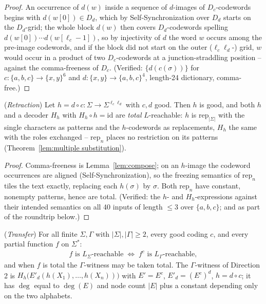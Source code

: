 \begin{proof}
    An occurrence of $d(w)$ inside a sequence of $d$-images of
    $D_c$-codewords begins with $d(w[0]) \in D_d$, which by
    Self-Synchronization over $D_d$ starts on the $D_d$-grid; the whole
    block $d(w)$ then covers $D_d$-codewords spelling
    $d(w[0]) \cdots d(w[\ell_c{-}1])$, so by injectivity of $d$ the word $w$
    occurs among the pre-image codewords, and if the block did not start on
    the outer ($\ell_c\ell_d$-) grid, $w$ would occur in a product of two
    $D_c$-codewords at a junction-straddling position -- against the
    comma-freeness of $D_c$. (Verified: $\{d(c(\sigma))\}$ for $c :
    \{a,b,c\} \rightarrow \{x,y\}^6$ and $d : \{x,y\} \rightarrow
    \{a,b,c\}^4$, length-24 dictionary, comma-free.)
\end{proof}

\begin{lemma}
    (\emph{Retraction})
    \label{lem:retract}
    Let $h = d \circ c : \Sigma \rightarrow \Sigma^{\ell_c\ell_d}$ with
    $c, d$ good. Then $h$ is good, and both $h$ and a decoder $H_h$ with
    $H_h \circ h = \mathrm{id}$ are \emph{total} $L$-reachable: $h$ is
    $\mathrm{rep}_{|\Sigma|}$ with the single characters as patterns and
    the $h$-codewords as replacements, $H_h$ the same with the roles
    exchanged -- $\mathrm{rep}_n$ places no restriction on its patterns
    (Theorem~\ref{lem:multiple substitution}).
\end{lemma}

\begin{proof}
    Comma-freeness is Lemma~\ref{lem:compose}; on an $h$-image the codeword
    occurrences are aligned (Self-Synchronization), so the freezing
    semantics of $\mathrm{rep}_n$ tiles the text exactly, replacing each
    $h(\sigma)$ by $\sigma$. Both $\mathrm{rep}_n$ have constant, nonempty
    patterns, hence are total. (Verified: the $h$- and $H_h$-expressions
    against their intended semantics on all 40 inputs of length $\le 3$
    over $\{a,b,c\}$; and as part of the roundtrip below.)
\end{proof}

\begin{theorem}
    (\emph{Transfer})
    \label{thm:transfer}
    For all finite $\Sigma, \Gamma$ with $|\Sigma|, |\Gamma| \ge 2$, every
    good coding $c$, and every partial function $f$ on $\Sigma^*$:
    \begin{align}
        f \text{ is $L_\Sigma$-reachable} \;\iff\; f^c \text{ is
        $L_\Gamma$-reachable},
    \end{align}
    and when $f$ is total the $\Gamma$-witness may be taken total. The
    $\Gamma$-witness of Direction 2 is $H_h\big(E'_d(h(X_1), \dots,
    h(X_n))\big)$ with $E' = E^c$, $E'_d = (E^c)^d$, $h = d \circ c$; it has
    $\deg$ equal to $\deg(E)$ and node count $|E|$ plus a constant depending
    only on the two alphabets.
\end{theorem}

